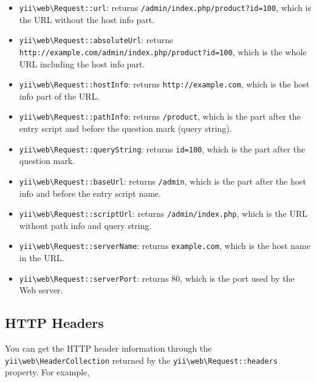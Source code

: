 \begin{itemize}
\item \texttt{yii{\allowbreak{}\textbackslash}web{\allowbreak{}\textbackslash}Request\allowbreak{}::\allowbreak{}url}: returns \lstinline|/admin/index.php/product?id=100|, which is the URL without the host info part. 
\item \texttt{yii{\allowbreak{}\textbackslash}web{\allowbreak{}\textbackslash}Request\allowbreak{}::\allowbreak{}absoluteUrl}: returns \lstinline|http://example.com/admin/index.php/product?id=100|,
which is the whole URL including the host info part.
\item \texttt{yii{\allowbreak{}\textbackslash}web{\allowbreak{}\textbackslash}Request\allowbreak{}::\allowbreak{}hostInfo}: returns \lstinline|http://example.com|, which is the host info part of the URL.
\item \texttt{yii{\allowbreak{}\textbackslash}web{\allowbreak{}\textbackslash}Request\allowbreak{}::\allowbreak{}pathInfo}: returns \lstinline|/product|, which is the part after the entry script and 
before the question mark (query string).
\item \texttt{yii{\allowbreak{}\textbackslash}web{\allowbreak{}\textbackslash}Request\allowbreak{}::\allowbreak{}queryString}: returns \lstinline|id=100|, which is the part after the question mark. 
\item \texttt{yii{\allowbreak{}\textbackslash}web{\allowbreak{}\textbackslash}Request\allowbreak{}::\allowbreak{}baseUrl}: returns \lstinline|/admin|, which is the part after the host info and before
the entry script name.
\item \texttt{yii{\allowbreak{}\textbackslash}web{\allowbreak{}\textbackslash}Request\allowbreak{}::\allowbreak{}scriptUrl}: returns \lstinline|/admin/index.php|, which is the URL without path info and query string.
\item \texttt{yii{\allowbreak{}\textbackslash}web{\allowbreak{}\textbackslash}Request\allowbreak{}::\allowbreak{}serverName}: returns \lstinline|example.com|, which is the host name in the URL.
\item \texttt{yii{\allowbreak{}\textbackslash}web{\allowbreak{}\textbackslash}Request\allowbreak{}::\allowbreak{}serverPort}: returns 80, which is the port used by the Web server.
\end{itemize}
\subsection{HTTP Headers \label{runtime-requests.md::http-headers}}
You can get the HTTP header information through the \texttt{yii{\allowbreak{}\textbackslash}web{\allowbreak{}\textbackslash}HeaderCollection} returned 
by the \texttt{yii{\allowbreak{}\textbackslash}web{\allowbreak{}\textbackslash}Request\allowbreak{}::\allowbreak{}headers} property. For example,

